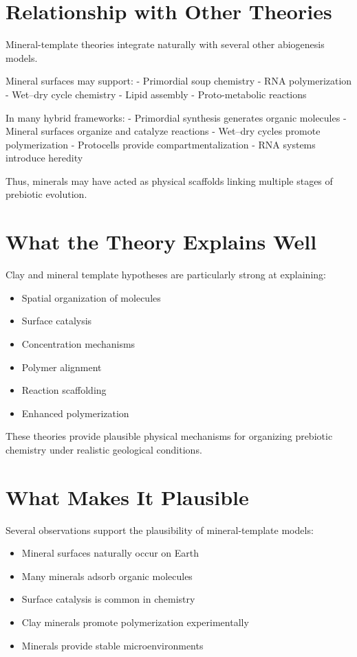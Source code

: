 \documentclass[
  oneside]{book}
\providecommand{\tightlist}{%
  \setlength{\itemsep}{0pt}\setlength{\parskip}{0pt}}
\begin{document}
\section{Relationship with Other Theories}\label{relationship-with-other-theories-1}

Mineral-template theories integrate naturally with several other abiogenesis models.

Mineral surfaces may support:
- Primordial soup chemistry
- RNA polymerization
- Wet--dry cycle chemistry
- Lipid assembly
- Proto-metabolic reactions

In many hybrid frameworks:
- Primordial synthesis generates organic molecules
- Mineral surfaces organize and catalyze reactions
- Wet--dry cycles promote polymerization
- Protocells provide compartmentalization
- RNA systems introduce heredity

Thus, minerals may have acted as physical scaffolds linking multiple stages of prebiotic evolution.

\section{What the Theory Explains Well}\label{what-the-theory-explains-well-5}

Clay and mineral template hypotheses are particularly strong at explaining:

\begin{itemize}
\tightlist
\item
  Spatial organization of molecules
\item
  Surface catalysis
\item
  Concentration mechanisms
\item
  Polymer alignment
\item
  Reaction scaffolding
\item
  Enhanced polymerization
\end{itemize}

These theories provide plausible physical mechanisms for organizing prebiotic chemistry under realistic geological conditions.

\section{What Makes It Plausible}\label{what-makes-it-plausible-5}

Several observations support the plausibility of mineral-template models:

\begin{itemize}
\tightlist
\item
  Mineral surfaces naturally occur on Earth
\item
  Many minerals adsorb organic molecules
\item
  Surface catalysis is common in chemistry
\item
  Clay minerals promote polymerization experimentally
\item
  Minerals provide stable microenvironments
\end{itemize}
\end{document}
